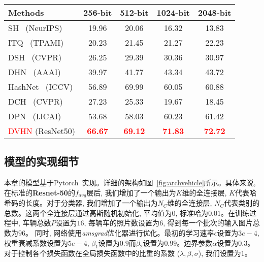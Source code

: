   \begin{table}[!htpb]
    \centering
    \begin{tabular}{cccccc}
       \\ \hline
    \multicolumn{2}{l|}{Methods} & 256-bit & 512-bit & 1024-bit & 2048-bit   \\\hline
    \multicolumn{2}{l|}{SH~\cite{weiss2008spectral} (NeurIPS)} & 19.96 & 20.06  & 16.32 &  13.83 \\  
    \multicolumn{2}{l|}{ITQ~\cite{gong2012iterative} (TPAMI)} & 20.23 & 21.45 & 21.27 & 22.23 \\  
    \hline
    \hline
    \multicolumn{2}{l|}{DSH~\cite{liu2016deep} (CVPR)} & 26.25 & 29.39 & 30.36 &  30.97\\
    \multicolumn{2}{l|}{DHN~\cite{zhu2016deep} (AAAI)} & 39.97 & 41.77 & 43.34 & 43.72 \\
    \multicolumn{2}{l|}{HashNet~\cite{cao2017hashnet} (ICCV)} & 56.89 & 69.99 & 60.05 & 60.88  \\
    \multicolumn{2}{l|}{DCH~\cite{cao2018deep} (CVPR)} & 27.23 & 25.33 & 19.67 & 18.45  \\
    \multicolumn{2}{l|}{DPN~\cite{fan2020deep} (IJCAI)} & 53.68 & 58.03 & 60.23 & 61.42  \\
    \hline
    \hline
     \multicolumn{2}{l|}{\textcolor{red}{DVHN} (ResNet50) }&\textcolor{red}{\textbf{66.67}} & \textcolor{red}{\textbf{69.12}} & \textcolor{red}{\textbf{71.83}} & \textcolor{red}{\textbf{72.72}} \\
     \hline
     \hline
    \end{tabular}
    \label{table:vid1600}
  \end{table}
  \subsection{模型的实现细节}
  本章的模型基于Pytorch~\cite{paszke2019pytorch}实现。详细的架构如图~\ref{fig:archvehicle}所示。具体来说, 在标准的\textbf{Resnet-50}的$f_{avg}$层后, 我们增加了一个输出为$K$维的全连接层, $K$代表哈希码的长度。对于分类器, 我们增加了一个输出为$N_C$维的全连接层, $N_C$代表类别的总数。这两个全连接层通过高斯随机初始化, 平均值为$0$, 标准哈为$0.01$。在训练过程中, 车辆总数$P$设置为$16$, 每辆车的照片数设置为$6$, 得到每一个批次的输入图片总数为$96$。 同时, 网络使用\textit{amsgrad}优化器进行优化。最初的学习速率$\epsilon$设置为$3e-4$, 权重衰减系数设置为$5e-4$, $\beta_1$设置为$0.9$而$\beta_2$设置为$0.99$。边界参数$\alpha$设置为$0.3$。对于控制各个损失函数在全局损失函数中的比重的系数 ($\lambda, \beta, \sigma$), 我们设置为$1$。

